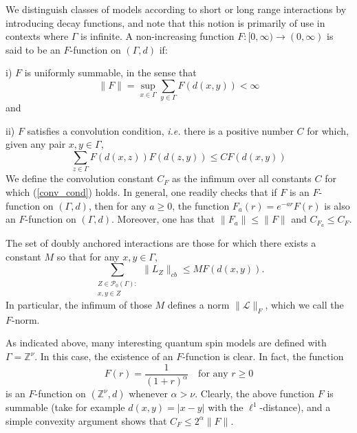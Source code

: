 \documentclass{article}
\newcommand{\<}{\langle}
\renewcommand{\>}{\rangle}
\numberwithin{equation}{section}
\theoremstyle{definition}
\begin{document}
%
%


We distinguish classes of models according to short or long range interactions by introducing decay functions, and note
that this notion is primarily of use in contexts where $\Gamma$ is infinite.
A non-increasing function $F:[0, \infty) \to (0, \infty)$ is said to be an $F$-function on $(\Gamma, d)$ if:

\noindent i) $F$ is uniformly summable, in the sense that
\begin{equation} \label{uni_sum}
\| F \| = \sup_{x \in \Gamma} \sum_{y \in \Gamma} F(d(x,y)) < \infty
\end{equation} 
and

\noindent ii) $F$ satisfies a convolution condition, \textit{i.e.} there is a positive number $C$ for which, given any pair $x,y \in \Gamma$,
\begin{equation} \label{conv_cond}
\sum_{z \in \Gamma} F(d(x,z)) F(d(z,y)) \leq C F(d(x,y)) 
\end{equation}
We define the convolution constant $C_F$ as the infimum over all constants $C$ for which (\ref{conv_cond}) holds.  
In general, one readily checks that if $F$ is an $F$-function on $(\Gamma, d)$, then for any $a \geq 0$, the function $F_a(r) = e^{-ar} F(r)$ is also
an $F$-function on $(\Gamma, d)$. Moreover, one has that $\| F_a \| \leq \| F \|$ and $C_{F_a} \leq C_F$. 

%
%

	The set of doubly anchored interactions are those for which there exists a constant $M$ so that for any $x,y\in \Gamma$,
	\begin{equation}
		\sum_{\substack{Z\in \mathcal{P}_0(\Gamma):\\ x,y\in Z}} \|L_Z\|_{cb} \le M F(d(x,y)). 
	\end{equation} In particular, the infimum of those $M$ defines a norm $\|\mathscr{L}\|_F$, which we call the $F$-norm.


As indicated above, many interesting quantum spin models are defined with $\Gamma = \mathbb{Z}^{\nu}$. In this case, the existence of an $F$-function
is clear. In fact, the function 
\begin{equation} \label{poly_F}
F(r) = \frac{1}{(1+r)^{\alpha}} \quad \mbox{for any } r \geq 0
\end{equation}
is an $F$-function on $(\mathbb{Z}^{\nu}, d)$ whenever $\alpha > \nu$. Clearly, the above function $F$ is summable (take for example $d(x,y) = |x-y|$ with the
$\ell^1$-distance), and a simple convexity argument shows that $C_F \leq 2^{\alpha} \| F \|$. 
\end{document}
